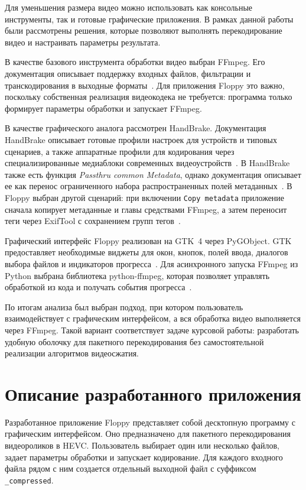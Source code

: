 \documentclass[14pt,a4paper]{extarticle}
\begin{document}
Для уменьшения размера видео можно использовать как консольные инструменты, так и готовые графические приложения. В рамках данной работы были рассмотрены решения, которые позволяют выполнять перекодирование видео и настраивать параметры результата.

В качестве базового инструмента обработки видео выбран FFmpeg. Его документация описывает поддержку входных файлов, фильтрации и транскодирования в выходные форматы~\cite{ffmpeg}. Для приложения Floppy это важно, поскольку собственная реализация видеокодека не требуется: программа только формирует параметры обработки и запускает FFmpeg.

В качестве графического аналога рассмотрен HandBrake. Документация HandBrake описывает готовые профили настроек для устройств и типовых сценариев, а также аппаратные профили для кодирования через специализированные медиаблоки современных видеоустройств~\cite{handbrake}. В HandBrake также есть функция \textit{Passthru common Metadata}, однако документация описывает ее как перенос ограниченного набора распространенных полей метаданных~\cite{handbrakemetadata}. В Floppy выбран другой сценарий: при включении \texttt{Copy metadata} приложение сначала копирует метаданные и главы средствами FFmpeg, а затем переносит теги через ExifTool с сохранением групп тегов~\cite{ffmpegmetadata,exiftool}.

Графический интерфейс Floppy реализован на GTK~4 через PyGObject. GTK предоставляет необходимые виджеты для окон, кнопок, полей ввода, диалогов выбора файлов и индикаторов прогресса~\cite{pygobject}. Для асинхронного запуска FFmpeg из Python выбрана библиотека python-ffmpeg, которая позволяет управлять обработкой из кода и получать события прогресса~\cite{pythonffmpeg}.

По итогам анализа был выбран подход, при котором пользователь взаимодействует с графическим интерфейсом, а вся обработка видео выполняется через FFmpeg. Такой вариант соответствует задаче курсовой работы: разработать удобную оболочку для пакетного перекодирования без самостоятельной реализации алгоритмов видеосжатия.

\section{Описание разработанного приложения}

Разработанное приложение Floppy представляет собой десктопную программу с графическим интерфейсом. Оно предназначено для пакетного перекодирования видеороликов в HEVC. Пользователь выбирает один или несколько файлов, задает параметры обработки и запускает кодирование. Для каждого входного файла рядом с ним создается отдельный выходной файл с суффиксом \texttt{\_compressed}.
\end{document}
